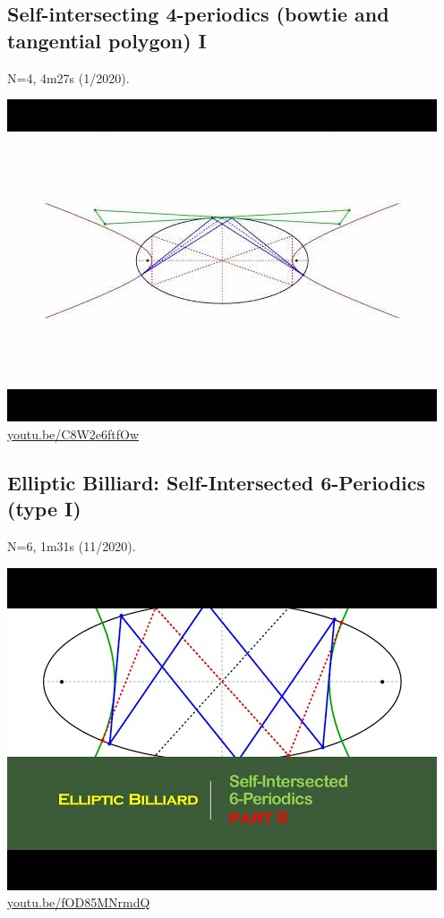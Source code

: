 \documentclass[12pt]{amsart}
\begin{document}
\subsection{Self-intersecting 4-periodics (bowtie and tangential polygon) I}
\label{vid:C8W2e6ftfOw}
\noindent N=4, 4m27s (1/2020). 
\begin{center}\includegraphics[width=.5\textwidth]{pics/C8W2e6ftfOw.jpg} \\ 
\href{https://youtu.be/C8W2e6ftfOw}{\url{youtu.be/C8W2e6ftfOw}}\end{center}
% 

\subsection{Elliptic Billiard: Self-Intersected 6-Periodics (type I)}
\label{vid:fOD85MNrmdQ}
\noindent N=6, 1m31s (11/2020). 
\begin{center}\includegraphics[width=.5\textwidth]{pics/fOD85MNrmdQ.jpg} \\ 
\href{https://youtu.be/fOD85MNrmdQ}{\url{youtu.be/fOD85MNrmdQ}}\end{center}
% 
\end{document}
